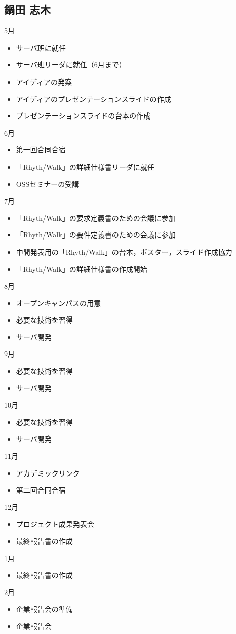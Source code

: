 \subsection{鍋田 志木}
5月
\begin{itemize}
\item サーバ班に就任
\item サーバ班リーダに就任（6月まで）
\item アイディアの発案
\item アイディアのプレゼンテーションスライドの作成
\item プレゼンテーションスライドの台本の作成
\end{itemize}
6月
\begin{itemize}
\item 第一回合同合宿
\item 「Rhyth/Walk」の詳細仕様書リーダに就任
\item OSSセミナーの受講
\end{itemize}
7月
\begin{itemize}
\item 「Rhyth/Walk」の要求定義書のための会議に参加
\item 「Rhyth/Walk」の要件定義書のための会議に参加
\item 中間発表用の「Rhyth/Walk」の台本，ポスター，スライド作成協力
\item 「Rhyth/Walk」の詳細仕様書の作成開始
\end{itemize}
8月
\begin{itemize}
\item オープンキャンパスの用意
\item 必要な技術を習得
\item サーバ開発
\end{itemize}
9月
\begin{itemize}
\item 必要な技術を習得
\item サーバ開発
\end{itemize}
10月
\begin{itemize}
\item 必要な技術を習得
\item サーバ開発
\end{itemize}
11月
\begin{itemize}
\item アカデミックリンク
\item 第二回合同合宿
\end{itemize}
12月
\begin{itemize}
\item プロジェクト成果発表会
\item 最終報告書の作成
\end{itemize}
1月
\begin{itemize}
\item 最終報告書の作成
\end{itemize}
2月
\begin{itemize}
\item 企業報告会の準備
\item 企業報告会
\end{itemize}
